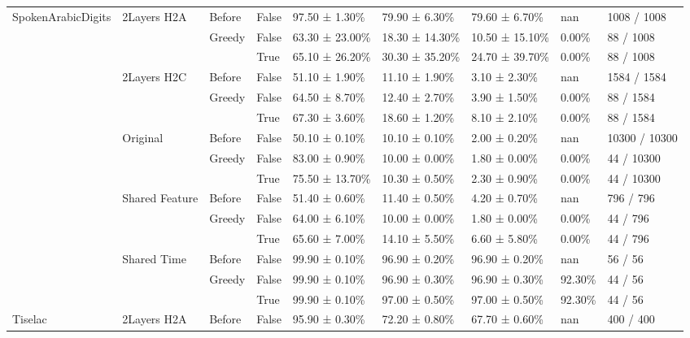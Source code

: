 \begin{tabular}{lllllllll}
\cline{1-9} \cline{2-9} \cline{3-9}
\multirow[t]{15}{*}{SpokenArabicDigits} & \multirow[t]{3}{*}{2Layers H2A} & Before & False & 97.50 ± 1.30\% & 79.90 ± 6.30\% & 79.60 ± 6.70\% & nan & 1008 / 1008 \\
\cline{3-9}
 &  & \multirow[t]{2}{*}{Greedy} & False & 63.30 ± 23.00\% & 18.30 ± 14.30\% & 10.50 ± 15.10\% & 0.00\% & 88 / 1008 \\
 &  &  & True & 65.10 ± 26.20\% & 30.30 ± 35.20\% & 24.70 ± 39.70\% & 0.00\% & 88 / 1008 \\
\cline{2-9} \cline{3-9}
 & \multirow[t]{3}{*}{2Layers H2C} & Before & False & 51.10 ± 1.90\% & 11.10 ± 1.90\% & 3.10 ± 2.30\% & nan & 1584 / 1584 \\
\cline{3-9}
 &  & \multirow[t]{2}{*}{Greedy} & False & 64.50 ± 8.70\% & 12.40 ± 2.70\% & 3.90 ± 1.50\% & 0.00\% & 88 / 1584 \\
 &  &  & True & 67.30 ± 3.60\% & 18.60 ± 1.20\% & 8.10 ± 2.10\% & 0.00\% & 88 / 1584 \\
\cline{2-9} \cline{3-9}
 & \multirow[t]{3}{*}{Original} & Before & False & 50.10 ± 0.10\% & 10.10 ± 0.10\% & 2.00 ± 0.20\% & nan & 10300 / 10300 \\
\cline{3-9}
 &  & \multirow[t]{2}{*}{Greedy} & False & 83.00 ± 0.90\% & 10.00 ± 0.00\% & 1.80 ± 0.00\% & 0.00\% & 44 / 10300 \\
 &  &  & True & 75.50 ± 13.70\% & 10.30 ± 0.50\% & 2.30 ± 0.90\% & 0.00\% & 44 / 10300 \\
\cline{2-9} \cline{3-9}
 & \multirow[t]{3}{*}{Shared Feature} & Before & False & 51.40 ± 0.60\% & 11.40 ± 0.50\% & 4.20 ± 0.70\% & nan & 796 / 796 \\
\cline{3-9}
 &  & \multirow[t]{2}{*}{Greedy} & False & 64.00 ± 6.10\% & 10.00 ± 0.00\% & 1.80 ± 0.00\% & 0.00\% & 44 / 796 \\
 &  &  & True & 65.60 ± 7.00\% & 14.10 ± 5.50\% & 6.60 ± 5.80\% & 0.00\% & 44 / 796 \\
\cline{2-9} \cline{3-9}
 & \multirow[t]{3}{*}{Shared Time} & Before & False & 99.90 ± 0.10\% & 96.90 ± 0.20\% & 96.90 ± 0.20\% & nan & 56 / 56 \\
\cline{3-9}
 &  & \multirow[t]{2}{*}{Greedy} & False & 99.90 ± 0.10\% & 96.90 ± 0.30\% & 96.90 ± 0.30\% & 92.30\% & 44 / 56 \\
 &  &  & True & 99.90 ± 0.10\% & 97.00 ± 0.50\% & 97.00 ± 0.50\% & 92.30\% & 44 / 56 \\
\cline{1-9} \cline{2-9} \cline{3-9}
\multirow[t]{15}{*}{Tiselac} & \multirow[t]{3}{*}{2Layers H2A} & Before & False & 95.90 ± 0.30\% & 72.20 ± 0.80\% & 67.70 ± 0.60\% & nan & 400 / 400 \\

\end{tabular}
